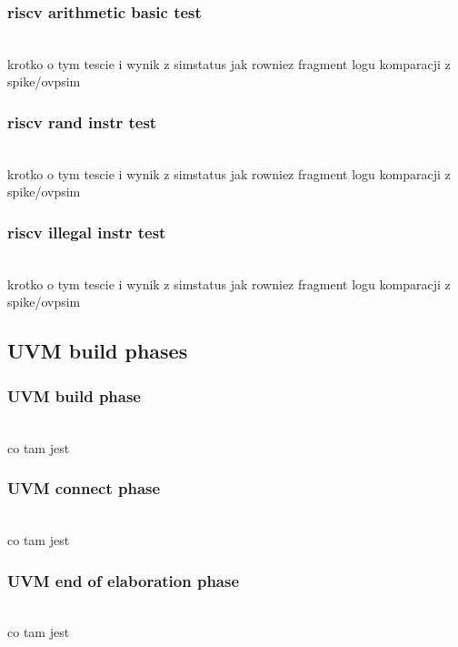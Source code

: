 \documentclass[11pt,a4paper]{article}
\begin{document}
		\subsubsection{riscv arithmetic basic test}
		\hspace{5mm}
			\\krotko o tym tescie i wynik z simstatus jak rowniez fragment logu komparacji z spike/ovpsim
			
		\subsubsection{riscv rand instr test}
		\hspace{5mm}
			\\krotko o tym tescie i wynik z simstatus jak rowniez fragment logu komparacji z spike/ovpsim
			
		\subsubsection{riscv illegal instr test}
		\hspace{5mm}
			\\krotko o tym tescie i wynik z simstatus jak rowniez fragment logu komparacji z spike/ovpsim

	\subsection{UVM build phases}
	
		\subsubsection{UVM build phase}
		\hspace{5mm}
			\\co tam jest
			
		\subsubsection{UVM connect phase}
		\hspace{5mm}
			\\co tam jest
	
		\subsubsection{UVM end of elaboration phase}
		\hspace{5mm}
			\\co tam jest	
	
\end{document}
